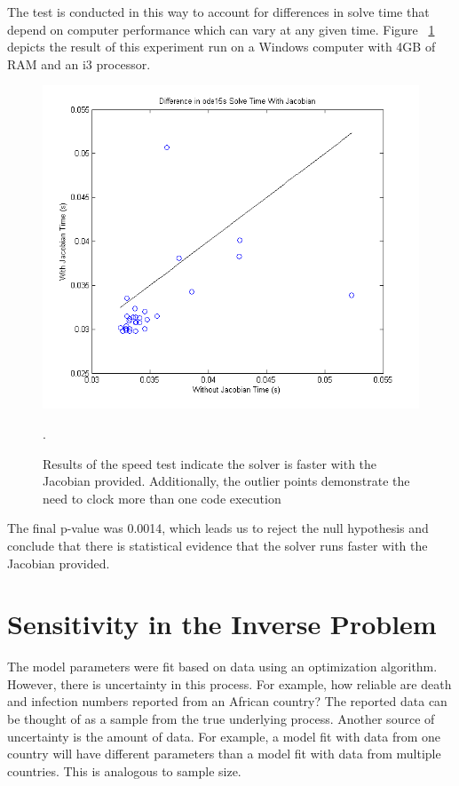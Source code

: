 \documentclass[10pt,a4paper]{article}
\begin{document}
The test is conducted in this way to account for differences in solve time that depend on computer performance which can vary at any given time. Figure ~\ref{fig:speedtest} depicts the result of this experiment run on a Windows computer with 4GB of RAM and an i3 processor.

\begin{figure}[!ht]
\centering
\includegraphics[scale=0.6]{speedtest}
\caption{Results of the speed test indicate the solver is faster with the Jacobian provided. Additionally, the outlier points demonstrate the need to clock more than one code execution}.
\label{fig:speedtest}
\end{figure}

The final p-value was 0.0014, which leads us to reject the null hypothesis and conclude that there is statistical evidence that the solver runs faster with the Jacobian provided.


\section*{Sensitivity in the Inverse Problem}

The model parameters were fit based on data using an optimization algorithm. However, there is uncertainty in this process.  For example, how reliable are death and infection numbers reported from an African country? The reported data can be thought of as a sample from the true underlying process. Another source of uncertainty is the amount of data. For example, a model fit with data from one country will have different parameters than a model fit with data from multiple countries. This is analogous to sample size.
\end{document}
